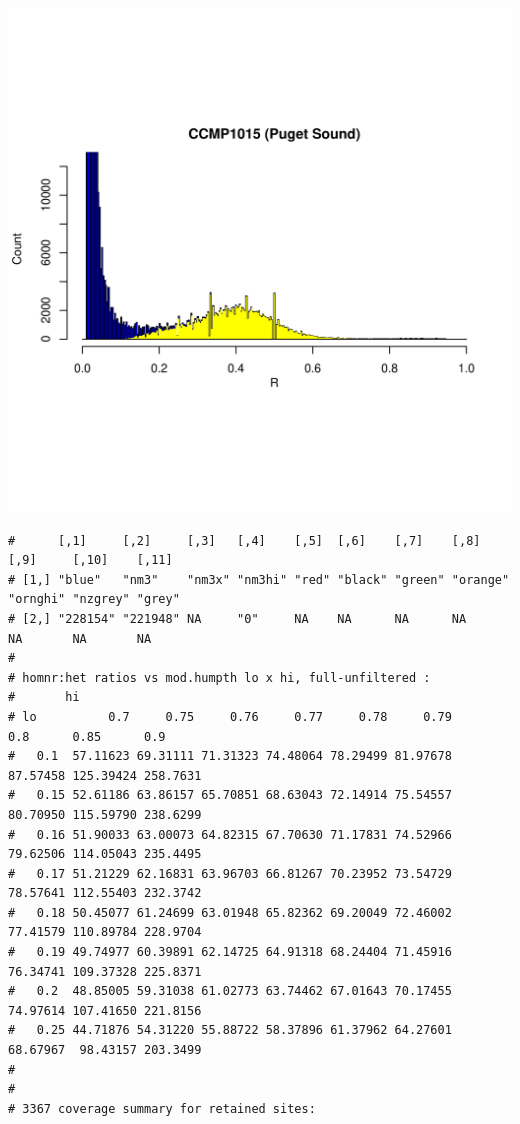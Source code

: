 \documentclass{article}\usepackage[]{graphicx}\usepackage[]{color}
\makeatletter
\def\maxwidth{ %
  \ifdim\Gin@nat@width>\linewidth
    \linewidth
  \else
    \Gin@nat@width
  \fi
}
\newenvironment{kframe}{%
 \def\at@end@of@kframe{}%
 \ifinner\ifhmode%
  \def\at@end@of@kframe{\end{minipage}}%
  \begin{minipage}{\columnwidth}%
 \fi\fi%
 \def\FrameCommand##1{\hskip\@totalleftmargin \hskip-\fboxsep
 \colorbox{shadecolor}{##1}\hskip-\fboxsep
     \hskip-\linewidth \hskip-\@totalleftmargin \hskip\columnwidth}%
 \MakeFramed {\advance\hsize-\width
   \@totalleftmargin\z@ \linewidth\hsize
   \@setminipage}}%
 {\par\unskip\endMakeFramed%
 \at@end@of@kframe}
\newenvironment{knitrout}{}{} %
\makeatother
\begin{document}
\begin{knitrout}
\includegraphics[width=\maxwidth]{FigS7-hwe-histo-figs-knitr/unnamed-chunk-10-9} 
\begin{kframe}\begin{verbatim}
#      [,1]     [,2]     [,3]   [,4]    [,5]  [,6]    [,7]    [,8]     [,9]     [,10]    [,11] 
# [1,] "blue"   "nm3"    "nm3x" "nm3hi" "red" "black" "green" "orange" "ornghi" "nzgrey" "grey"
# [2,] "228154" "221948" NA     "0"     NA    NA      NA      NA       NA       NA       NA
# 
# homnr:het ratios vs mod.humpth lo x hi, full-unfiltered :
#       hi
# lo          0.7     0.75     0.76     0.77     0.78     0.79      0.8      0.85      0.9
#   0.1  57.11623 69.31111 71.31323 74.48064 78.29499 81.97678 87.57458 125.39424 258.7631
#   0.15 52.61186 63.86157 65.70851 68.63043 72.14914 75.54557 80.70950 115.59790 238.6299
#   0.16 51.90033 63.00073 64.82315 67.70630 71.17831 74.52966 79.62506 114.05043 235.4495
#   0.17 51.21229 62.16831 63.96703 66.81267 70.23952 73.54729 78.57641 112.55403 232.3742
#   0.18 50.45077 61.24699 63.01948 65.82362 69.20049 72.46002 77.41579 110.89784 228.9704
#   0.19 49.74977 60.39891 62.14725 64.91318 68.24404 71.45916 76.34741 109.37328 225.8371
#   0.2  48.85005 59.31038 61.02773 63.74462 67.01643 70.17455 74.97614 107.41650 221.8156
#   0.25 44.71876 54.31220 55.88722 58.37896 61.37962 64.27601 68.67967  98.43157 203.3499
# 
# 
# 3367 coverage summary for retained sites:

\end{verbatim}
\end{kframe}
\end{knitrout}
\end{document}
